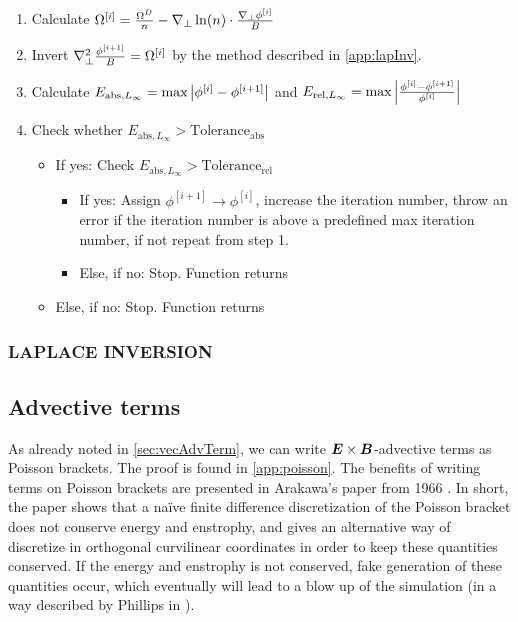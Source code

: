 \begin{algorithm}
\begin{enumerate}
    \item Calculate
        $ \Omega^{[i]} = \frac{\Omega^D}{n} -
        \nabla_\perp \ln(n) \cdot\frac{\nabla_\perp\phi^{[i]}}{B}
        $
    \item Invert $\nabla_\perp^2 \frac{\phi^{[i+1]}}{B} = \Omega^{[i]}$ by the method
        described in \cref{app:lapInv}.
    \item Calculate
        $E_{\text{abs}, L_\infty} = \text{max} \left|\phi^{[i]} - \phi^{[i+1]}\right|$
        and
        $E_{\text{rel}, L_\infty} = \text{max} \left|\frac{\phi^{[i]} - \phi^{[i+1]}}{\phi^{[i]}}\right|$
    \item Check whether $E_{\text{abs}, L_\infty} > \text{Tolerance}_\text{abs}$
    \begin{itemize}[noitemsep,nolistsep]
        \item If yes: Check $E_{\text{abs}, L_\infty} > \text{Tolerance}_\text{rel}$
            \begin{itemize}[noitemsep,nolistsep]
                \item If yes: Assign $\phi^{[i+1]} \to \phi^{[i]}$, increase the
                    iteration number, throw an error if the iteration number is
                    above a predefined max iteration number, if not repeat from
                    step 1.
                \item Else, if no: Stop. Function returns
            \end{itemize}
        \item Else, if no: Stop. Function returns
    \end{itemize}
\end{enumerate}
\end{algorithm}

\subsubsection{LAPLACE INVERSION}


\subsection{Advective terms}
\label{sec:ExBadv}
%
As already noted in \cref{sec:vecAdvTerm}, we can write $\boldsymbol{E}\times\boldsymbol{B}$-advective terms as Poisson brackets.
The proof is found in \cref{app:poisson}.
The benefits of writing terms on Poisson brackets are presented in Arakawa's paper from 1966 \cite{Arakwa1966}.
In short, the paper shows that a na\"ive finite difference discretization of the Poisson bracket does not conserve energy and enstrophy, and gives an alternative way of discretize in orthogonal curvilinear coordinates in order to keep these quantities conserved.
If the energy and enstrophy is not conserved, fake generation of these quantities occur, which eventually will lead to a blow up of the simulation (in a way described by Phillips in \cite{Phillips1959}).

